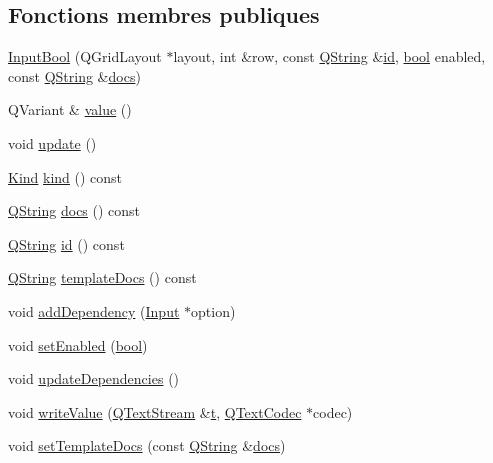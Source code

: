\subsection*{Fonctions membres publiques}
\begin{DoxyCompactItemize}
\item 
\hyperlink{class_input_bool_aa88502f4b9003ac1513f4286095348f9}{Input\+Bool} (Q\+Grid\+Layout $\ast$layout, int \&row, const \hyperlink{class_q_string}{Q\+String} \&\hyperlink{class_input_bool_a6f67a6e052be4d249ce78a760cbf9224}{id}, \hyperlink{qglobal_8h_a1062901a7428fdd9c7f180f5e01ea056}{bool} enabled, const \hyperlink{class_q_string}{Q\+String} \&\hyperlink{class_input_bool_aedb9acc995075518636589c840fe9856}{docs})
\item 
Q\+Variant \& \hyperlink{class_input_bool_a0798a64139304e63ab3e2c67dcf5d0d6}{value} ()
\item 
void \hyperlink{class_input_bool_a4430d88dc8bf58a9166dc84bef7b7782}{update} ()
\item 
\hyperlink{class_input_a4138334795f6330759839617744e20a9}{Kind} \hyperlink{class_input_bool_a776c09b3f7c91a24f126063bd9388a28}{kind} () const 
\item 
\hyperlink{class_q_string}{Q\+String} \hyperlink{class_input_bool_aedb9acc995075518636589c840fe9856}{docs} () const 
\item 
\hyperlink{class_q_string}{Q\+String} \hyperlink{class_input_bool_a6f67a6e052be4d249ce78a760cbf9224}{id} () const 
\item 
\hyperlink{class_q_string}{Q\+String} \hyperlink{class_input_bool_aa4603113305c42b037258c1102ac4256}{template\+Docs} () const 
\item 
void \hyperlink{class_input_bool_a36279aa5a2078ccedad5ab36e4106be6}{add\+Dependency} (\hyperlink{class_input}{Input} $\ast$option)
\item 
void \hyperlink{class_input_bool_a4a289ec0e02329cd950fe7ad4a08fe9a}{set\+Enabled} (\hyperlink{qglobal_8h_a1062901a7428fdd9c7f180f5e01ea056}{bool})
\item 
void \hyperlink{class_input_bool_a87d74369df2db35004c265be9c4593ab}{update\+Dependencies} ()
\item 
void \hyperlink{class_input_bool_a4df0a3a3df21135cf337c5cb516d8705}{write\+Value} (\hyperlink{class_q_text_stream}{Q\+Text\+Stream} \&\hyperlink{058__bracket__recursion_8tcl_a69e959f6901827e4d8271aeaa5fba0fc}{t}, \hyperlink{class_q_text_codec}{Q\+Text\+Codec} $\ast$codec)
\item 
void \hyperlink{class_input_bool_ad07ccc2906cd40e6443e83541d85aff0}{set\+Template\+Docs} (const \hyperlink{class_q_string}{Q\+String} \&\hyperlink{class_input_bool_aedb9acc995075518636589c840fe9856}{docs})
\end{DoxyCompactItemize}
